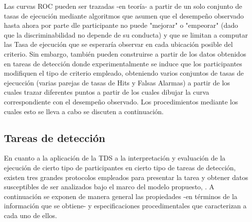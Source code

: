 Las curvas ROC pueden ser trazadas -en teoría- a partir de un solo conjunto de tasas de ejecución \parencite{Pollack1964a, Pollack1964b,McNicol2} mediante algoritmos que asumen que el desempeño observado hasta ahora por parte dle participante no puede "mejorar" o "empeorar" (dado que la discriminabilidad no depende de su conducta) y que se limitan a computar las Tasa de ejecución que se esperaría observar en cada ubicación posible del criterio. Sin embargo, también pueden construirse a partir de los datos obtenidos en tareas de detección donde experimentalmente se induce que los participantes modifiquen el tipo de criterio empleado, obteniendo varios conjuntos de tasas de ejecucción (varias parejas de tasas de Hits y Falsas Alarmas) a partir de los cuales trazar diferentes puntos a partir de los cuales dibujar la curva correspondiente con el desempeño observado. Los procedimientos mediante los cuales esto se lleva a cabo se discuten a continuación.\\


\subsection{Tareas de detección}

En cuanto a la aplicación de la TDS a la interpretación y evaluación de la ejecución de cierto tipo de participantes en cierto tipo de tareas de detección, existen tres grandes protocolos empleados para presentar la tarea y obtener datos susceptibles de ser analizados bajo el marco del modelo propuesto, \parencite{McNicol2}. A continuación se exponen de manera general las propiedades -en términos de la información que se obtiene- y especificaciones procedimentales que caracterizan a cada uno de ellos.\\

